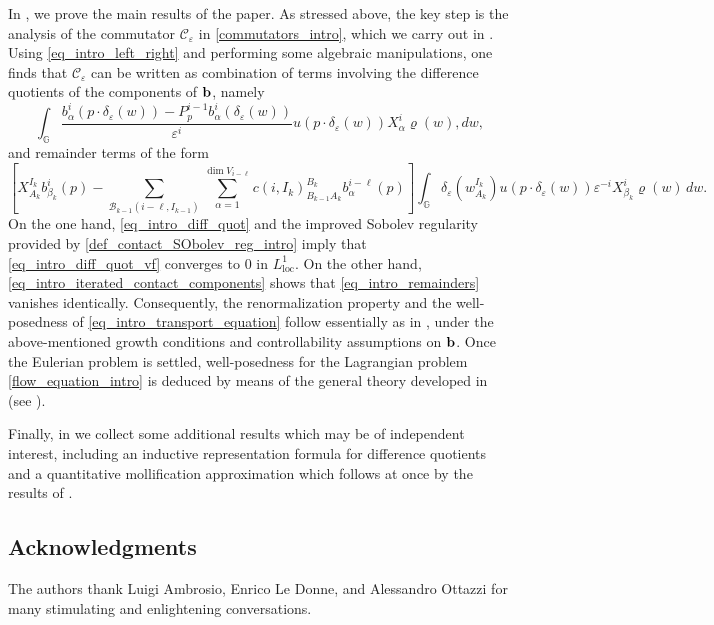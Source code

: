 \documentclass[11pt]{amsart}
\newcommand{\bb}{{\bf {b}}} %
\renewcommand{\rho}{\varrho} %
\newcommand{\eps}{\varepsilon}
\theoremstyle{plain}
\theoremstyle{definition}
\theoremstyle{remark}
\numberwithin{equation}{section}
\begin{document}
 \medskip
In , we prove the main results of the paper. As stressed above, the key step is the analysis of the commutator $\mathscr C_\eps$ in \eqref{commutators_intro}, which we carry out in .
Using \eqref{eq_intro_left_right} and performing some algebraic manipulations, one finds that $\mathscr C_\eps$ can be written as combination of terms involving the difference quotients of the components of $\bb$, namely
\begin{equation} \label{eq_intro_diff_quot_vf}
\int_{\mathbb{G}} \frac{b^i_\alpha(p \cdot \delta_\eps(w))-P^{i-1}_p b^i_\alpha (\delta_\eps(w))}{\eps^i} u(p \cdot \delta_\eps(w)) X^i_\alpha \rho(w),dw,
\end{equation}
and remainder terms of the form
\begin{equation} \label{eq_intro_remainders}
\left[X^{I_k}_{A_k} b^i_{\beta_k}(p) - \sum_{\mathcal B_{k-1}(i-\ell,I_{k-1})} \sum_{\alpha=1}^{\dim V_{i-\ell}} c(i,I_k)_{B_{k-1} A_k}^{B_k} b^{i-\ell}_\alpha(p)\right] \int_{\mathbb{G}} \delta_\eps\left(w^{I_k}_{A_k}\right) u(p \cdot \delta_\eps(w)) \eps^{-i} X^i_{\beta_k} \rho(w) \,dw.
\end{equation}
On the one hand, \eqref{eq_intro_diff_quot} and the improved Sobolev regularity provided by \eqref{def_contact_SObolev_reg_intro} imply that \eqref{eq_intro_diff_quot_vf} converges to $0$ in $L^1_{\mathrm{loc}}$. On the other hand, \eqref{eq_intro_iterated_contact_components} shows that \eqref{eq_intro_remainders} vanishes identically. Consequently, the renormalization property and the well-posedness of \eqref{eq_intro_transport_equation} follow essentially as in \cite{dpl1}, under the above-mentioned growth conditions and controllability assumptions on $\bb$. Once the Eulerian problem is settled, well-posedness for the Lagrangian problem \eqref{flow_equation_intro} is deduced by means of the general theory developed in \cite{MR2409676,MR3283066} (see ).

\medskip
Finally, in  we collect some additional results which may be of independent interest, including an inductive representation formula for difference quotients and a quantitative mollification approximation which follows at once by the results of .

\subsection*{Acknowledgments}
The authors thank Luigi Ambrosio, Enrico Le Donne, and Alessandro Ottazzi for many stimulating and enlightening conversations.
\end{document}

